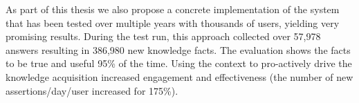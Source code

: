 As part of this thesis we also propose a concrete implementation of the 
system that has been tested over multiple years with thousands of users, yielding very promising results. During the test run, this approach collected
over 57,978 answers resulting in 386,980 new knowledge facts. The evaluation shows the facts to be true and useful 95\% of the time. Using the context to pro-actively drive the knowledge acquisition increased engagement and effectiveness (the number of new assertions/day/user increased for 175\%).